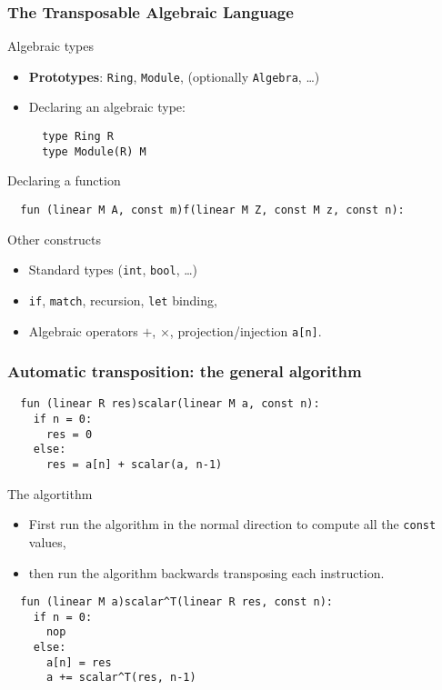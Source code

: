 \documentclass[10pt]{beamer}
\begin{document}
\begin{frame}[fragile]
  \frametitle{The Transposable Algebraic Language}

  \begin{block}{Algebraic types}
    \begin{itemize}
    \item \textbf{Prototypes}: {\tt Ring}, {\tt Module}, (optionally
      {\tt Algebra}, \dots)
    \item Declaring an algebraic type:
\begin{lstlisting}
  type Ring R
  type Module(R) M
\end{lstlisting}
    \end{itemize}
  \end{block}

  \begin{block}{Declaring a function}
\begin{lstlisting}
  fun (linear M A, const m)f(linear M Z, const M z, const n):
\end{lstlisting}
  \end{block}

  \begin{block}{Other constructs}
    \begin{itemize}
    \item Standard types ({\tt int}, {\tt bool}, \ldots)
    \item {\tt if}, {\tt match}, recursion, {\tt let} binding,
    \item Algebraic operators $+$, $\times$, projection/injection
      \verb|a[n]|.
    \end{itemize}
  \end{block}
\end{frame}


\begin{frame}[fragile]
  \frametitle{Automatic transposition: the general algorithm}

\begin{lstlisting}
  fun (linear R res)scalar(linear M a, const n):
    if n = 0:
      res = 0
    else:
      res = a[n] + scalar(a, n-1)
\end{lstlisting}

  \begin{block}{The algortithm}
    \begin{itemize}
    \item First run the algorithm in the normal direction to compute
      all the {\tt const} values,
    \item then run the algorithm backwards transposing each instruction.
    \end{itemize}
  \end{block}

\begin{lstlisting}
  fun (linear M a)scalar^T(linear R res, const n):
    if n = 0:
      nop
    else:
      a[n] = res
      a += scalar^T(res, n-1)
\end{lstlisting}
\end{frame}
\end{document}
